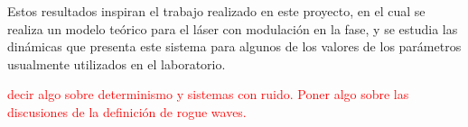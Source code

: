 		Estos resultados inspiran el trabajo realizado en este proyecto, en el cual se realiza un modelo teórico para el láser con modulación en la fase, y se estudia las dinámicas que presenta este sistema para algunos de los valores de los parámetros usualmente utilizados en el laboratorio.
		 
		 
		 \textcolor{red}{decir algo sobre determinismo y sistemas con ruido.}
		 \textcolor{red}{Poner algo sobre las discusiones de la definición de rogue waves.}
		 
